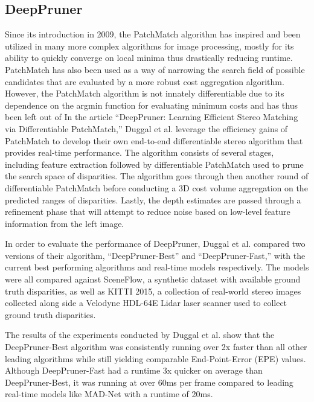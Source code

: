 \documentclass{article}
\begin{document}
\subsection{DeepPruner}
Since its introduction in 2009, the PatchMatch algorithm \citep{barnes2009patchmatch} has inspired and been utilized in many more complex algorithms for image processing, mostly for its ability to quickly converge on local minima thus drastically reducing runtime. PatchMatch has also been used as a way of narrowing the search field of possible candidates that are evaluated by a more robust cost aggregation algorithm. However, the PatchMatch algorithm is not innately differentiable due to its dependence on the argmin function for evaluating minimum costs and has thus been left out of
In the article “DeepPruner: Learning Efficient Stereo Matching via Differentiable PatchMatch,” Duggal et al. \citep{duggal2019deeppruner} leverage the efficiency gains of PatchMatch to develop their own end-to-end differentiable stereo algorithm that provides real-time performance. The algorithm consists of several stages, including feature extraction followed by differentiable PatchMatch used to prune the search space of disparities. The algorithm goes through then another round of differentiable PatchMatch before conducting a 3D cost volume aggregation on the predicted ranges of disparities. Lastly, the depth estimates are passed through a refinement phase that will attempt to reduce noise based on low-level feature information from the left image.

In order to evaluate the performance of DeepPruner, Duggal et al. \citep{duggal2019deeppruner} compared two versions of their algorithm, “DeepPruner-Best” and “DeepPruner-Fast,” with the current best performing algorithms and real-time models respectively. The models were all compared against SceneFlow, a synthetic dataset with available ground truth disparities, as well as KITTI 2015, a collection of real-world stereo images collected along side a Velodyne HDL-64E Lidar laser scanner used to collect ground truth disparities.

The results of the experiments conducted by Duggal et al. \citep{duggal2019deeppruner} show that the DeepPruner-Best algorithm was consistently running over 2x faster than all other leading algorithms while still yielding comparable End-Point-Error (EPE) values. Although DeepPruner-Fast had a runtime 3x quicker on average than DeepPruner-Best, it was running at over 60ms per frame compared to leading real-time models like MAD-Net with a runtime of 20ms.
\end{document}
